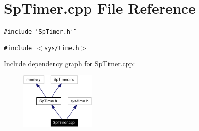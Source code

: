 \section{Sp\-Timer.cpp File Reference}
\label{SpTimer_8cpp}
{\tt \#include \char`\"{}Sp\-Timer.h\char`\"{}}\par
{\tt \#include $<$sys/time.h$>$}\par


Include dependency graph for Sp\-Timer.cpp:\begin{figure}[H]
\begin{center}
\leavevmode
\includegraphics[width=106pt]{SpTimer_8cpp__incl}
\end{center}
\end{figure}
